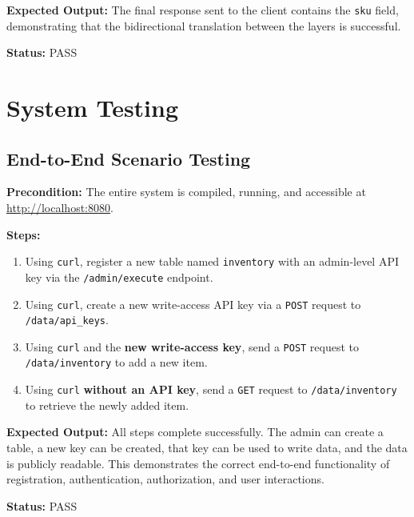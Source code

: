 \documentclass[12pt, a4paper]{report}
\begin{document}
\noindent\textbf{Expected Output:} The final response sent to the client contains the \lstinline|sku| field, demonstrating that the bidirectional translation between the layers is successful.

\noindent\textbf{Status:} PASS

\section{System Testing}

\subsection{End-to-End Scenario Testing}

\noindent\textbf{Precondition:} The entire system is compiled, running, and accessible at \url{http://localhost:8080}.

\noindent\textbf{Steps:}
\begin{enumerate}
    \item Using \lstinline|curl|, register a new table named \lstinline|inventory| with an admin-level API key via the \lstinline|/admin/execute| endpoint.
    \item Using \lstinline|curl|, create a new write-access API key via a \lstinline|POST| request to \lstinline|/data/api_keys|.
    \item Using \lstinline|curl| and the \textbf{new write-access key}, send a \lstinline|POST| request to \lstinline|/data/inventory| to add a new item.
    \item Using \lstinline|curl| \textbf{without an API key}, send a \lstinline|GET| request to \lstinline|/data/inventory| to retrieve the newly added item.
\end{enumerate}

\noindent\textbf{Expected Output:} All steps complete successfully. The admin can create a table, a new key can be created, that key can be used to write data, and the data is publicly readable. This demonstrates the correct end-to-end functionality of registration, authentication, authorization, and user interactions.

\noindent\textbf{Status:} PASS

\clearpage

\end{document}

